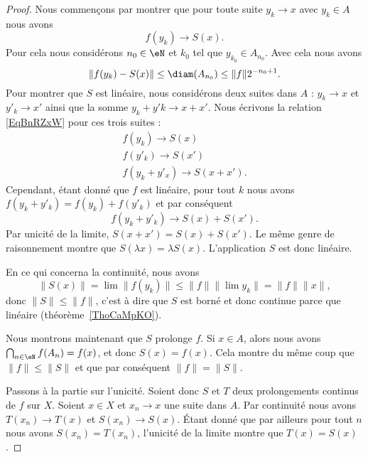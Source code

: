 \begin{proof}
    Nous commençons par montrer que pour toute suite \( y_k\to x\) avec \( y_k\in A\) nous avons
    \begin{equation}    \label{EqBnRZxW}
        f(y_k)\to S(x).
    \end{equation}
    Pour cela nous considérons \( n_0\in \eN\) et \( k_0\) tel que \( y_{k_0}\in A_{n_0}\). Avec cela nous avons
    \begin{equation}
        \| f(y_k)-S(x) \|\leq \diam(A_{n_0})\leq \| f \|2^{-n_0+1}.
    \end{equation}
    Pour montrer que \( S\) est linéaire, nous considérons deux suites dans \( A\) : \( y_k\to x\) et \( y'_k\to x'\) ainsi que la somme \( y_k+y'k\to x+x'\). Nous écrivons la relation \eqref{EqBnRZxW} pour ces trois suites :
    \begin{subequations}
        \begin{align}
            f(y_k)\to S(x)\\
            f(y'_k)\to S(x')\\
            f(y_k+y'_x)\to S(x+x').
        \end{align}
    \end{subequations}
    Cependant, étant donné que \( f\) est linéaire, pour tout \( k\) nous avons \( f(y_k+y'_k)=f(y_k)+f(y'_k)\) et par conséquent
    \begin{equation}
        f(y_k+y'_k)\to S(x)+S(x').
    \end{equation}
    Par unicité de la limite, \( S(x+x')=S(x)+S(x')\). Le même genre de raisonnement montre que \( S(\lambda x)=\lambda S(x)\). L'application \( S\) est donc linéaire.

    En ce qui concerna la continuité, nous avons
    \begin{equation}
            \| S(x) \|=\lim\| f(y_k) \|\leq \| f \|\| \lim y_k \|=\| f \|\| x \|,
    \end{equation}
    donc \( \| S \|\leq \| f \|\), c'est à dire que \( S\) est borné et donc continue parce que linéaire (théorème~\ref{ThoCaMpKO}).

    Nous montrons maintenant que \( S\) prolonge \( f\). Si \( x\in A\), alors nous avons \( \bigcap_{n\in \eN}f(A_n)=f(x)\), et donc \( S(x)=f(x)\). Cela montre du même coup que \( \| f \|\leq \| S \|\) et que par conséquent \( \| f \|=\| S \|\).

    Passons à la partie sur l'unicité. Soient donc \( S\) et \( T\)  deux prolongements continus de \( f\) sur \( X\). Soient \( x\in X\) et \( x_n\to x\) une suite dans \( A\). Par continuité nous avons \( T(x_n)\to T(x)\) et \( S(x_n)\to S(x)\). Étant donné que par ailleurs pour tout \( n\) nous avons \( S(x_n)=T(x_n)\), l'unicité de la limite montre que \( T(x)=S(x)\).
\end{proof}

